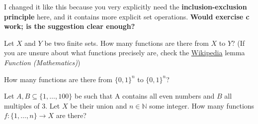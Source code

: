 \documentclass[a4paper,10pt,landscape,twocolumn]{scrartcl}
\begin{document}
\begin{exercise}
	\begin{mycomment}
	I changed it like this because you very explicitly need the \textbf{inclusion-exclusion principle} here, and it contains more explicit set operations. \textbf{Would exercise c work; is the suggestion clear enough?}
	\end{mycomment}
	
	\begin{subex}[1pt]
		Let $X$ and $Y$ be two finite sets. How many functions are there from $X$ to $Y$?
		 (If you are unsure about what functions precisely are, check the \href{https://en.wikipedia.org/wiki/Function_(mathematics)}{Wikipedia} lemma \emph{Function (Mathematics)})
	\end{subex}
	
	\begin{subex}[1pt]
	How many functions are there from $\{0,1\}^n$ to $\{0,1\}^n$?	
	\end{subex}
	
	\begin{subex}[1pt]
		Let $A, B \subseteq \{1, \dots, 100\}$ be such that A contains all even numbers and $B$ all multiples of 3. Let $X$ be their union and $n\in \mathbb{N}$ some integer. How many functions $f: \{1, \dots, n\} \to X$ are there?
	\end{subex}
	
\end{exercise}
\end{document}
